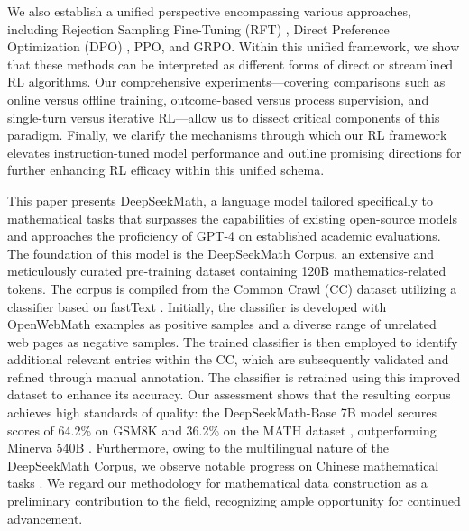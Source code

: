 {We also establish a unified perspective encompassing various approaches, including Rejection Sampling Fine-Tuning (RFT) \citep{yuan2023scaling}, Direct Preference Optimization (DPO) \citep{dpo}, PPO, and GRPO. Within this unified framework, we show that these methods can be interpreted as different forms of direct or streamlined RL algorithms. Our comprehensive experiments—covering comparisons such as online versus offline training, outcome-based versus process supervision, and single-turn versus iterative RL—allow us to dissect critical components of this paradigm. Finally, we clarify the mechanisms through which our RL framework elevates instruction-tuned model performance and outline promising directions for further enhancing RL efficacy within this unified schema.

This paper presents DeepSeekMath, a language model tailored specifically to mathematical tasks that surpasses the capabilities of existing open-source models and approaches the proficiency of GPT-4 on established academic evaluations. The foundation of this model is the DeepSeekMath Corpus, an extensive and meticulously curated pre-training dataset containing 120B mathematics-related tokens. The corpus is compiled from the Common Crawl (CC) dataset utilizing a classifier based on fastText \citep{joulin2016fasttext}. Initially, the classifier is developed with OpenWebMath examples \citep{openwebmath} as positive samples and a diverse range of unrelated web pages as negative samples. The trained classifier is then employed to identify additional relevant entries within the CC, which are subsequently validated and refined through manual annotation. The classifier is retrained using this improved dataset to enhance its accuracy. Our assessment shows that the resulting corpus achieves high standards of quality: the DeepSeekMath-Base 7B model secures scores of 64.2\% on GSM8K \citep{gsm8k} and 36.2\% on the MATH dataset \citep{MATH}, outperforming Minerva 540B \citep{minerva}. Furthermore, owing to the multilingual nature of the DeepSeekMath Corpus, we observe notable progress on Chinese mathematical tasks \citep{wei2023cmath,agieval}. We regard our methodology for mathematical data construction as a preliminary contribution to the field, recognizing ample opportunity for continued advancement.

}
